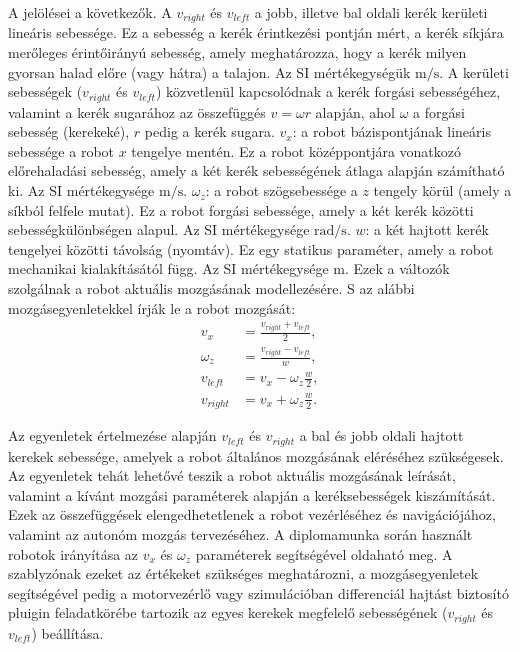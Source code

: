 A  jelölései a következők. A $v_{right}$ és $v_{left}$ a jobb, illetve bal oldali kerék kerületi lineáris sebessége. Ez a sebesség a kerék érintkezési pontján mért, a kerék síkjára merőleges érintőirányú sebesség, amely meghatározza, hogy a kerék milyen gyorsan halad előre (vagy hátra) a talajon. Az SI mértékegységük $\mathrm{m/s}$. A kerületi sebességek ($v_{right}$ és $v_{left}$) közvetlenül kapcsolódnak a kerék forgási sebességéhez, valamint a kerék sugarához az összefüggés $v = \omega r$ alapján, ahol $\omega$ a forgási sebesség (kerekeké), $r$ pedig a kerék sugara. $v_x$: a robot bázispontjának lineáris sebessége a robot $x$ tengelye mentén. Ez a robot középpontjára vonatkozó előrehaladási sebesség, amely a két kerék sebességének átlaga alapján számítható ki. Az SI mértékegysége $\mathrm{m/s}$.
$\omega_z$: a robot szögsebessége a $z$ tengely körül (amely a síkból felfele mutat). Ez a robot forgási sebessége, amely a két kerék közötti sebességkülönbségen alapul. Az SI mértékegysége $\mathrm{rad/s}$. $w$: a két hajtott kerék tengelyei közötti távolság (nyomtáv). Ez egy statikus paraméter, amely a robot mechanikai kialakításától függ. Az SI mértékegysége $\mathrm{m}$. Ezek a változók szolgálnak a robot aktuális mozgásának modellezésére. S az alábbi mozgásegyenletekkel írják le a robot mozgását:
\begin{align}
    v_{x}      & = \frac{v_{right} + v_{left}}{2}, \\
    \omega_{z} & = \frac{v_{right} - v_{left}}{w}, \\
    v_{left}   & = v_{x} - \omega_{z} \frac{w}{2}, \\
    v_{right}  & = v_{x} + \omega_{z} \frac{w}{2}.
\end{align}

Az egyenletek értelmezése alapján $v_{left}$ és $v_{right}$ a bal és jobb oldali hajtott kerekek sebessége, amelyek a robot általános mozgásának eléréséhez szükségesek. Az egyenletek tehát lehetővé teszik a robot aktuális mozgásának leírását, valamint a kívánt mozgási paraméterek alapján a keréksebességek kiszámítását. Ezek az összefüggések elengedhetetlenek a robot vezérléséhez és navigációjához, valamint az autonóm mozgás tervezéséhez. A diplomamunka során használt robotok irányítása az $v_x$ és $\omega_z$ paraméterek segítségével oldaható meg. A szablyzónak ezeket az értékeket szükséges meghatározni, a mozgásegyenletek segítségével pedig a motorvezérlő vagy szimulációban differenciál hajtást biztosító pluigin feladatkörébe tartozik az egyes kerekek megfelelő sebességének ($v_{right}$ és $v_{left}$) beállítása.


